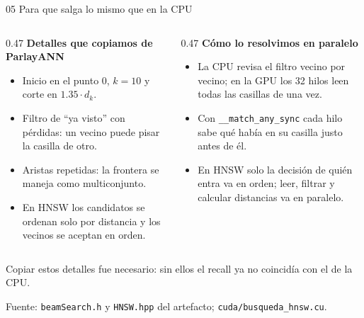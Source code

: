 \documentclass[aspectratio=169,10pt]{beamer}
\newcommand{\fuente}[1]{\vfill{\scriptsize\color{gray}Fuente: #1}}
\newcommand{\nota}[1]{\begin{center}\colorbox{azul!10}{\parbox{0.94\textwidth}{\centering\small #1}}\end{center}}
\begin{document}
\begin{frame}{05 \quad Para que salga lo mismo que en la CPU}
  \begin{columns}[T]
    \begin{column}{0.47\textwidth}
      \textbf{Detalles que copiamos de ParlayANN}
      \begin{itemize}
        \item Inicio en el punto 0, $k = 10$ y corte en $1.35 \cdot d_k$.
        \item Filtro de ``ya visto'' con pérdidas: un vecino puede pisar la casilla de otro.
        \item Aristas repetidas: la frontera se maneja como multiconjunto.
        \item En HNSW los candidatos se ordenan solo por distancia y los vecinos se
              aceptan en orden.
      \end{itemize}
    \end{column}
    \begin{column}{0.47\textwidth}
      \textbf{Cómo lo resolvimos en paralelo}
      \begin{itemize}
        \item La CPU revisa el filtro vecino por vecino; en la GPU los 32 hilos leen todas
              las casillas de una vez.
        \item Con \texttt{\_\_match\_any\_sync} cada hilo sabe qué había en su casilla
              justo antes de él.
        \item En HNSW solo la decisión de quién entra va en orden; leer, filtrar y calcular
              distancias va en paralelo.
      \end{itemize}
    \end{column}
  \end{columns}
  \vspace{4pt}
  \nota{Copiar estos detalles fue necesario: sin ellos el recall ya no coincidía con el de
  la CPU.}
  \fuente{\texttt{beamSearch.h} y \texttt{HNSW.hpp} del artefacto; \texttt{cuda/busqueda\_hnsw.cu}.}
\end{frame}
\end{document}
